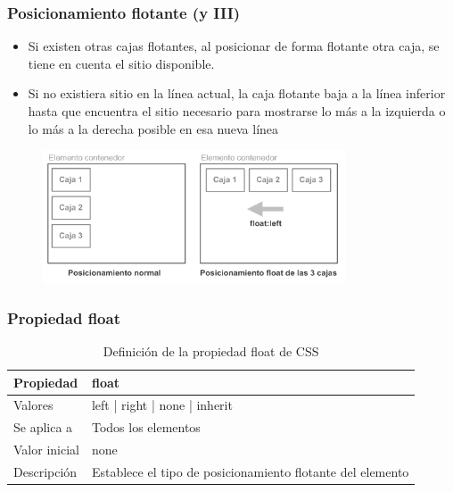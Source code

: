 \begin{frame}
\frametitle{Posicionamiento flotante (y III)}

\begin{itemize}
  \item Si existen otras cajas flotantes, al posicionar de forma flotante otra caja, se tiene en cuenta el sitio disponible.
  \item Si no existiera sitio en la línea actual, la caja flotante baja a la línea inferior hasta que encuentra el sitio necesario para mostrarse lo más a la izquierda o lo más a la derecha posible en esa nueva línea
\end{itemize}


\begin{center}
\begin{figure}[p]
\includegraphics[width=0.8\textwidth]{figs/f0509.png}
\end{figure}
\end{center}

\end{frame}



\begin{frame}
\frametitle{Propiedad float}

\begin{center}
  \begin{table}
   \begin{tabular}{p{1.8cm}p{7.8cm}}
Propiedad & \bf{float} \\ \hline
Valores& left | right | none | inherit \\ \hline
Se aplica a& Todos los elementos \\ \hline
Valor inicial& none \\ \hline
Descripción& Establece el tipo de posicionamiento flotante del elemento \\ \hline
  \end{tabular}
   \caption{Definición de la propiedad float de CSS}
 \end{table}
\end{center}


\end{frame}


